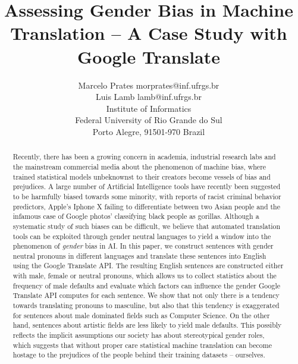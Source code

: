 \documentclass[jair,twoside,11pt,theapa]{article}
\begin{document}
\title{Assessing Gender Bias in Machine Translation -- A Case Study with Google Translate}

\author{\name Marcelo Prates \email morprates@inf.ufrgs.br \\
       \name Luis Lamb \email lamb@inf.ufrgs.br \\
       \addr Institute of Informatics \\
Federal University of Rio Grande do Sul \\
Porto Alegre, 91501-970 Brazil}


\maketitle


\begin{abstract}
Recently, there has been a growing concern in academia, industrial research labs and the mainstream commercial media about the phenomenon of machine bias, where trained statistical models unbeknownst to their creators become vessels of bias and prejudices. A large number of Artificial Intelligence tools have recently been suggested to be harmfully biased towards some minority, with reports of racist criminal behavior predictors, Apple's Iphone X failing to differentiate between two Asian people and the infamous case of Google photos' classifying black people as gorillas. Although a systematic study of such biases can be difficult, we believe that automated translation tools can be exploited through gender neutral languages to yield a window into the phenomenon of \emph{gender} bias in AI. 
In this paper, we construct sentences with gender neutral pronouns in different languages 
and translate these sentences into English using the Google Translate API. 
The resulting English sentences are constructed either with male, female or neutral pronouns, which allows us to collect statistics about the frequency of male defaults and evaluate which factors can influence the gender Google Translate 
API computes for each sentence. We show that not only there is a tendency towards translating pronouns to
masculine, but also that this tendency is exaggerated for sentences about male dominated fields such as Computer Science. On the other hand, sentences about artistic fields are less likely to yield male defaults. This possibly reflects the implicit assumptions our society has about stereotypical gender roles, which suggests that without proper care statistical machine translation can become hostage to the prejudices of the people behind their training datasets -- ourselves.
\end{abstract}
\end{document}

